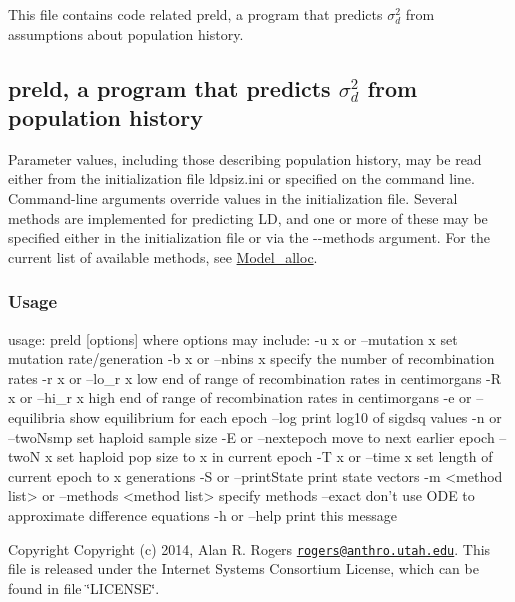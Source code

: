 This file contains code related preld, a program that predicts $\sigma_d^2$ from assumptions about population history.

\subsection*{{\ttfamily preld}, a program that predicts $\sigma_d^2$ from population history }

Parameter values, including those describing population history, may be read either from the initialization file {\ttfamily ldpsiz.\+ini} or specified on the command line. Command-\/line arguments override values in the initialization file. Several methods are implemented for predicting L\+D, and one or more of these may be specified either in the initialization file or via the {\ttfamily -\/-\/methods} argument. For the current list of available methods, see \hyperlink{model_8h_a1c02862e00fd2fd232c5ba777beadc84}{Model\+\_\+alloc}.

\subsubsection*{Usage }

\begin{DoxyVerb}usage: preld [options]
   where options may include:
   -u \<x\> or --mutation \<x\>
      set mutation rate/generation
   -b \<x\> or --nbins \<x\>
      specify the number of recombination rates
   -r \<x\> or --lo_r \<x\>
      low end of range of recombination rates in centimorgans
   -R \<x\> or --hi_r \<x\>
      high end of range of recombination rates in centimorgans
   -e or --equilibria
      show equilibrium for each epoch
   --log
      print log10 of sigdsq values
   -n or --twoNsmp
      set haploid sample size
   -E or --nextepoch
      move to next earlier epoch
   --twoN \<x\>
      set haploid pop size to x in current epoch
   -T \<x\> or --time \<x\>
      set length of current epoch to x generations
   -S or --printState
      print state vectors
   -m <method list> or --methods <method list>
      specify methods
   --exact
      don't use ODE to approximate difference equations
   -h or --help
      print this message
\end{DoxyVerb}


\begin{DoxyCopyright}{Copyright}
Copyright (c) 2014, Alan R. Rogers \href{mailto:rogers@anthro.utah.edu}{\tt rogers@anthro.\+utah.\+edu}. This file is released under the Internet Systems Consortium License, which can be found in file \char`\"{}\+L\+I\+C\+E\+N\+S\+E\char`\"{}. 
\end{DoxyCopyright}
